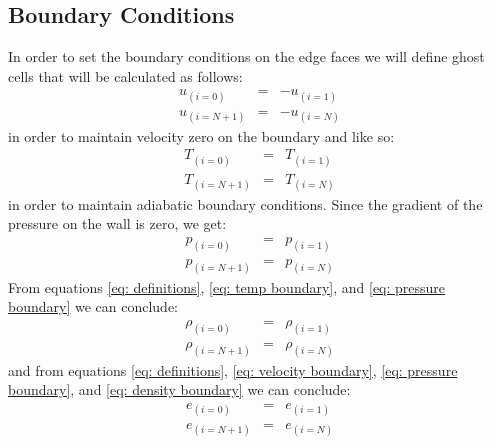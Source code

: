 \documentclass[11pt, a4paper]{article}
\begin{document}
\subsection{Boundary Conditions}
In order to set the boundary conditions on the edge faces we will define ghost cells that will be calculated as follows:
\begin{equation}
    \begin{array}{lcl}
        u_{\left(i=0\right)} &=& -u_{\left(i=1\right)} \\
        u_{\left(i=N+1\right)} &=& -u_{\left(i=N\right)}
    \end{array}
    \label{eq: velocity boundary}
\end{equation}
in order to maintain velocity zero on the boundary and like so:
\begin{equation}
    \begin{array}{lcl}
        T_{\left(i=0\right)} &=& T_{\left(i=1\right)} \\
        T_{\left(i=N+1\right)} &=& T_{\left(i=N\right)}
    \end{array}
    \label{eq: temp boundary}
\end{equation}
in order to maintain adiabatic boundary conditions.
Since the gradient of the pressure on the wall is zero, we get:
\begin{equation}
    \begin{array}{lcl}
        p_{\left(i=0\right)} &=& p_{\left(i=1\right)} \\
        p_{\left(i=N+1\right)} &=& p_{\left(i=N\right)}
    \end{array}
    \label{eq: pressure boundary}
\end{equation}
From equations \ref{eq: definitions}, \ref{eq: temp boundary}, and \ref{eq: pressure boundary} we can conclude:
\begin{equation}
    \begin{array}{lcl}
        \rho_{\left(i=0\right)} &=& \rho_{\left(i=1\right)} \\
        \rho_{\left(i=N+1\right)} &=& \rho_{\left(i=N\right)}
    \end{array}
    \label{eq: density boundary}
\end{equation}
and from equations \ref{eq: definitions}, \ref{eq: velocity boundary}, \ref{eq: pressure boundary}, and \ref{eq: density boundary} we can conclude:
\begin{equation}
    \begin{array}{lcl}
        e_{\left(i=0\right)} &=& e_{\left(i=1\right)} \\
        e_{\left(i=N+1\right)} &=& e_{\left(i=N\right)}
    \end{array}
    \label{eq: energy boundary}
\end{equation}
\newpage
\end{document}
